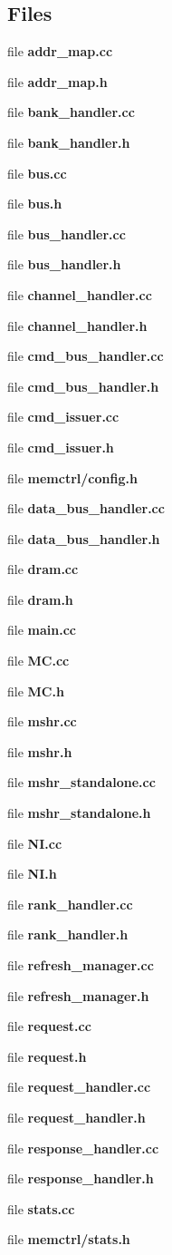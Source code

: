 \subsection*{Files}
\begin{CompactItemize}
\item 
file {\bf addr\_\-map.cc}
\item 
file {\bf addr\_\-map.h}
\item 
file {\bf bank\_\-handler.cc}
\item 
file {\bf bank\_\-handler.h}
\item 
file {\bf bus.cc}
\item 
file {\bf bus.h}
\item 
file {\bf bus\_\-handler.cc}
\item 
file {\bf bus\_\-handler.h}
\item 
file {\bf channel\_\-handler.cc}
\item 
file {\bf channel\_\-handler.h}
\item 
file {\bf cmd\_\-bus\_\-handler.cc}
\item 
file {\bf cmd\_\-bus\_\-handler.h}
\item 
file {\bf cmd\_\-issuer.cc}
\item 
file {\bf cmd\_\-issuer.h}
\item 
file {\bf memctrl/config.h}
\item 
file {\bf data\_\-bus\_\-handler.cc}
\item 
file {\bf data\_\-bus\_\-handler.h}
\item 
file {\bf dram.cc}
\item 
file {\bf dram.h}
\item 
file {\bf main.cc}
\item 
file {\bf MC.cc}
\item 
file {\bf MC.h}
\item 
file {\bf mshr.cc}
\item 
file {\bf mshr.h}
\item 
file {\bf mshr\_\-standalone.cc}
\item 
file {\bf mshr\_\-standalone.h}
\item 
file {\bf NI.cc}
\item 
file {\bf NI.h}
\item 
file {\bf rank\_\-handler.cc}
\item 
file {\bf rank\_\-handler.h}
\item 
file {\bf refresh\_\-manager.cc}
\item 
file {\bf refresh\_\-manager.h}
\item 
file {\bf request.cc}
\item 
file {\bf request.h}
\item 
file {\bf request\_\-handler.cc}
\item 
file {\bf request\_\-handler.h}
\item 
file {\bf response\_\-handler.cc}
\item 
file {\bf response\_\-handler.h}
\item 
file {\bf stats.cc}
\item 
file {\bf memctrl/stats.h}
\end{CompactItemize}
